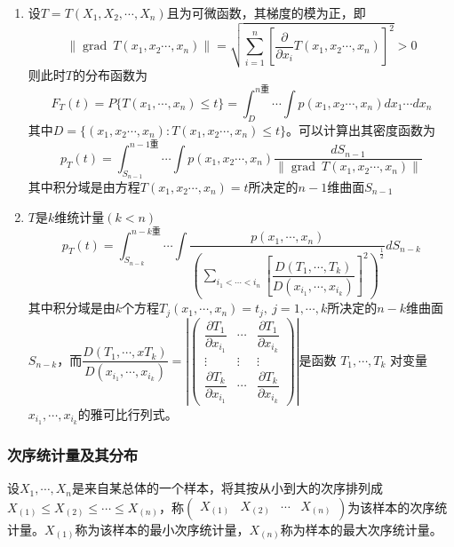 \begin{enumerate}[label = \arabic*\textsuperscript{$\circ$}]
    \item 设$T = T(X_1,X_2,\cdots,X_n)$且为可微函数，其梯度的模为正，即
    \[
        \left\lVert \operatorname{grad}\ T(x_1,x_2\cdots, x_n) \right\rVert = \sqrt{\sum\limits_{i = 1}^n\left[ \frac{\partial}{\partial x_i}T(x_1,x_2\cdots, x_n) \right]^2}>0 
    \]
    则此时$T$的分布函数为
    \[
        F_T(t) = P\{ T(x_1,\cdots,x_n)\leqslant t \} = \displaystyle\int_{D}^{n\text{重}}\cdots \displaystyle\int p(x_1,x_2\cdots, x_n)dx_1\cdots dx_n
    \]
    其中$D = \{(x_1,x_2\cdots, x_n):T(x_1,x_2\cdots, x_n)\leqslant t\}$。可以计算出其密度函数为
    \[
        p_T(t)=\displaystyle\int_{S_{n-1}}^{n-1\text{重}}\cdots \displaystyle\int p(x_1,x_2\cdots, x_n)\dfrac{d S_{n-1}}{\left\lVert \operatorname{grad}\ T(x_1,x_2\cdots, x_n) \right\rVert}
    \]
    其中积分域是由方程$T(x_1,x_2\cdots, x_n)=t$所决定的$n-1$维曲面$S_{n-1}$
    \item $T$是$k$维统计量$(k<n)$
    \[
        p_T(t) =\displaystyle\int_{S_{n-k}}^{n-k\text{重}}\cdots \displaystyle\int\dfrac{p(x_1,\cdots, x_n)}{\left(\sum\limits_{i_1<\cdots<i_n}\left[\dfrac{D(T_1,\cdots,T_k)}{D(x_{i_1},\cdots,x_{i_k})}\right]^2\right)^{\frac{1}{2}}}dS_{n-k}
    \]
    其中积分域是由$k$个方程$T_j(x_1,\cdots,x_n)=t_j,\ j = 1,\cdots, k$所决定的$n-k$维曲面$S_{n-k}$，而$\dfrac{D(T_1,\cdots,xT_k)}{D(x_{i_1},\cdots,x_{i_k})} =  \left\lvert \begin{pmatrix}
        \dfrac{\partial T_1}{\partial x_{i_1}} & \cdots & \dfrac{\partial T_1}{\partial x_{i_k}}\\
        \vdots & \vdots & \vdots \\
        \dfrac{\partial T_k}{\partial x_{i_1}} & \cdots & \dfrac{\partial T_k}{\partial x_{i_k}}
    \end{pmatrix} \right\rvert $是函数 $T_1,\cdots,T_k$ 对变量 $x_{i_1},\cdots,x_{i_k}$的雅可比行列式。
\end{enumerate}

\subsubsection{次序统计量及其分布}
\begin{definition}[次序统计量]
    设$X_1,\cdots,X_n$是来自某总体的一个样本，将其按从小到大的次序排列成$X_{(1)}\leqslant X_{(2)}\leqslant\cdots\leqslant X_{(n)}$，称$\begin{pmatrix}
        X_{(1)}&X_{(2)}&\cdots&X_{(n)}
    \end{pmatrix}$为该样本的次序统计量。$X_{(1)}$称为该样本的最小次序统计量，$X_{(n)}$称为样本的最大次序统计量。
\end{definition}

